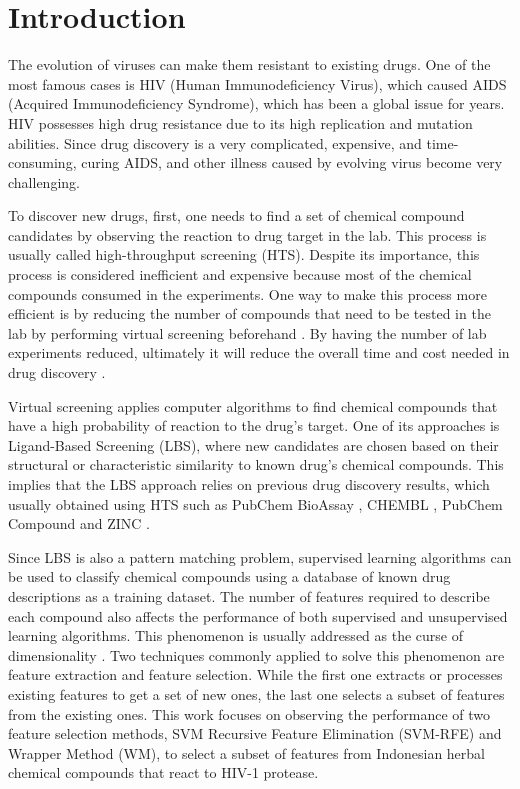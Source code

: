 \documentclass[conference]{IEEEtran}
\begin{document}
\IEEEpeerreviewmaketitle

\section{Introduction}

The evolution of viruses can make them resistant to existing drugs. One of the most famous cases is HIV (Human Immunodeficiency Virus), which caused AIDS (Acquired Immunodeficiency Syndrome), which has been a global issue for years. HIV possesses high drug resistance due to its high replication and mutation abilities. Since drug discovery is a very complicated, expensive, and time-consuming, curing AIDS, and other illness caused by evolving virus become very challenging\cite{yanuar2014virtual}.

To discover new drugs, first, one needs to find a set of chemical compound candidates by observing the reaction to drug target in the lab. This process is usually called high-throughput screening (HTS). Despite its importance, this process is considered inefficient and expensive because most of the chemical compounds consumed in the experiments. One way to make this process more efficient is by reducing the number of compounds that need to be tested in the lab by performing virtual screening beforehand \cite{chen2017developing}. By having the number of lab experiments reduced, ultimately it will reduce the overall time and cost needed in drug discovery \cite{korkmaz2014drug}.

Virtual screening applies computer algorithms to find chemical compounds that have a high probability of reaction to the drug's target. One of its approaches is Ligand-Based Screening (LBS), where new candidates are chosen based on their structural or characteristic similarity to known drug's chemical compounds. This implies that the LBS approach relies on previous drug discovery results, which usually obtained using HTS such as PubChem BioAssay \cite{bioassay2014update}, CHEMBL \cite{bento2014chembl}, PubChem Compound \cite{kim2015pubchem} and ZINC \cite{irwin2012zinc}.

Since LBS is also a pattern matching problem, supervised learning algorithms can be used to classify chemical compounds using a database of known drug descriptions as a training dataset. The number of features required to describe each compound also affects the performance of both supervised and unsupervised learning algorithms. This phenomenon is usually addressed as the curse of dimensionality \cite{janecek2008relationship}. Two techniques commonly applied to solve this phenomenon are feature extraction and feature selection. While the first one extracts or processes existing features to get a set of new ones, the last one selects a subset of features from the existing ones. This work focuses on observing the performance of two feature selection methods, SVM Recursive Feature Elimination (SVM-RFE) and Wrapper Method (WM), to select a subset of features from Indonesian herbal chemical compounds that react to HIV-1 protease.
\end{document}

